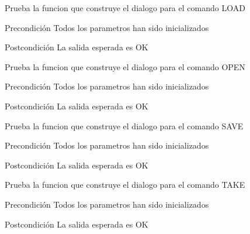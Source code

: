 \begin{DoxyRefList}
\item[\label{test__test000036}%
\hypertarget{test__test000036}{}%
Global \hyperlink{dialogue__test_8c_af9251f9bcff5723582b02b75aa8e3355}{test1\-\_\-dialogue\-\_\-load} ()]Prueba la funcion que construye el dialogo para el comando L\-O\-A\-D \begin{DoxyPrecond}{Precondición}
Todos los parametros han sido inicializados 
\end{DoxyPrecond}
\begin{DoxyPostcond}{Postcondición}
La salida esperada es O\-K  
\end{DoxyPostcond}

\item[\label{test__test000042}%
\hypertarget{test__test000042}{}%
Global \hyperlink{dialogue__test_8c_aa8943ea7fbda2915aec18563ea34a15b}{test1\-\_\-dialogue\-\_\-open} ()]Prueba la funcion que construye el dialogo para el comando O\-P\-E\-N \begin{DoxyPrecond}{Precondición}
Todos los parametros han sido inicializados 
\end{DoxyPrecond}
\begin{DoxyPostcond}{Postcondición}
La salida esperada es O\-K  
\end{DoxyPostcond}

\item[\label{test__test000034}%
\hypertarget{test__test000034}{}%
Global \hyperlink{dialogue__test_8c_a62498306df928040df7d75c5e37171dc}{test1\-\_\-dialogue\-\_\-save} ()]Prueba la funcion que construye el dialogo para el comando S\-A\-V\-E \begin{DoxyPrecond}{Precondición}
Todos los parametros han sido inicializados 
\end{DoxyPrecond}
\begin{DoxyPostcond}{Postcondición}
La salida esperada es O\-K  
\end{DoxyPostcond}

\item[\label{test__test000030}%
\hypertarget{test__test000030}{}%
Global \hyperlink{dialogue__test_8c_a4f8921974934b3cb18026e16feb6f046}{test1\-\_\-dialogue\-\_\-take} ()]Prueba la funcion que construye el dialogo para el comando T\-A\-K\-E \begin{DoxyPrecond}{Precondición}
Todos los parametros han sido inicializados 
\end{DoxyPrecond}
\begin{DoxyPostcond}{Postcondición}
La salida esperada es O\-K  
\end{DoxyPostcond}


\end{DoxyRefList}

